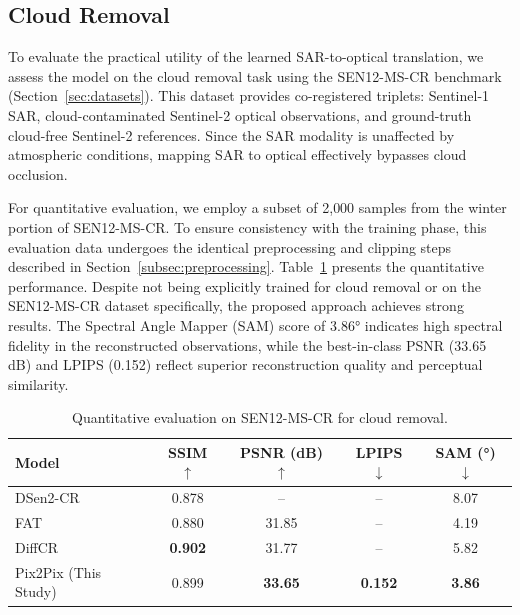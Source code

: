 \subsection{Cloud Removal}
\label{sec:cloud_removal}
To evaluate the practical utility of the learned SAR-to-optical translation, we assess the model on the cloud removal task using the SEN12-MS-CR benchmark (Section~\ref{sec:datasets}). This dataset provides co-registered triplets: Sentinel-1 SAR, cloud-contaminated Sentinel-2 optical observations, and ground-truth cloud-free Sentinel-2 references. Since the SAR modality is unaffected by atmospheric conditions, mapping SAR to optical effectively bypasses cloud occlusion.

For quantitative evaluation, we employ a subset of 2{,}000 samples from the winter portion of SEN12-MS-CR. To ensure consistency with the training phase, this evaluation data undergoes the identical preprocessing and clipping steps described in Section~\ref{subsec:preprocessing}. Table~\ref{tab:quantitative_result_cr} presents the quantitative performance. Despite not being explicitly trained for cloud removal or on the SEN12-MS-CR dataset specifically, the proposed approach achieves strong results. The Spectral Angle Mapper (SAM) score of 3.86° indicates high spectral fidelity in the reconstructed observations, while the best-in-class PSNR (33.65 dB) and LPIPS (0.152) reflect superior reconstruction quality and perceptual similarity.

\begin{table}[!htbp]
    \centering
    \caption[Quantitative results on cloud removal against SOTA models]{Quantitative evaluation on SEN12-MS-CR for cloud removal.}
    \begin{tabular}{lcccc}
        \toprule
        \textbf{Model}                & \textbf{SSIM $\uparrow$} & \textbf{PSNR (dB) $\uparrow$} & \textbf{LPIPS $\downarrow$} & \textbf{SAM (°) $\downarrow$} \\
        \midrule
        DSen2-CR~\cite{CR_SEN2_dRNN}  & 0.878                    & --                            & --                          & 8.07                          \\
        FAT~\cite{c_guided_fus_s2ot}  & 0.880                    & 31.85                         & --                          & 4.19                          \\
        DiffCR~\cite{DiffCR}          & \textbf{0.902}           & 31.77                         & --                          & 5.82                          \\
        Pix2Pix (This Study)         & 0.899                    & \textbf{33.65}                & \textbf{0.152}              & \textbf{3.86}                 \\
        \bottomrule
    \end{tabular}
    \label{tab:quantitative_result_cr}
\end{table}

